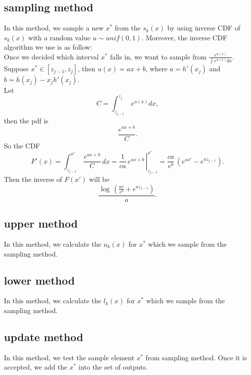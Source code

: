 \documentclass[11pt, oneside]{article}   	%
\begin{document}
\subsection*{ sampling method }
In this method, we sample a new $x^{*}$ from the $s_{k}(x)$ by using inverse CDF of  $s_{k}(x)$ with a random value $u \sim unif(0,1)$. Moreover, the inverse CDF algorithm we use is as follow: \\
Once we decided which interval $x^*$ falls in, we want to sample from $\frac{e^{u(x)}} {\int e^{u(x)} dx}$. Suppose $x^* \in [z_{j-1}, z_j]$, then $u(x) = ax+b $, where $a=h'(x_j)$ and $b=h(x_j)- x_j h'(x_j)$. \\
Let
\begin{displaymath}
C=\int_{z_{j-1}}^{z_j} \, e^{u(x)} dx,
\end{displaymath}
then the pdf is
\begin{displaymath}
\frac{e^{ax+b}}{C}.
\end{displaymath}
So the CDF
\begin{displaymath}
F'(x)=\int_{z_{j-1}}^{x'} \,  \frac{e^{ax+b}}{C} \, dx = \left. \frac{1}{ca}\, e^{ax+b} \, \right|_{z_{j-1}}^{x'} = \frac{ca}{e^b}\,(e^{ax'}-e^{az_{j-1}}).
\end{displaymath}
Then the inverse of $F(x')$ will be
\begin{displaymath}
\frac{\log\,(\frac{ac}{e^b}+e^{az_{j-1}})}{a}.
\end{displaymath}


\subsection*{ upper method }
In this method, we calculate the $u_{k}(x)$ for $x^*$ which we sample from the sampling method.


\subsection*{ lower method }
In this method, we calculate the $l_{k}(x)$ for $x^*$ which we sample from the sampling method.


\subsection*{ update method }
In this method, we test the sample element $x^{*}$ from sampling method. Once it is accepted, we add the $x^{*}$ into the set of outputs.

\end{document}
